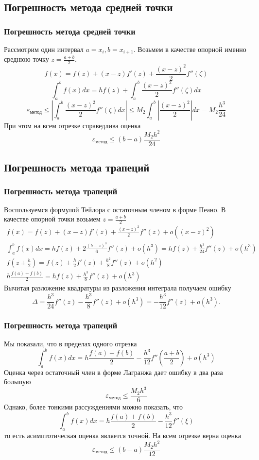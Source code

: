 \documentclass[aspectratio=169,unicode]{beamer}
\begin{document}
\subsection{Погрешность метода средней точки}
\begin{frame}
\frametitle{Погрешность метода средней точки}
	Рассмотрим один интервал $a=x_i, b=x_{i+1}$.
	Возьмем в качестве опорной именно среднюю точку $z = \frac{a+b}{2}$.
	\[
	f(x) = f(z) + (x-z)f'(z) + \frac{(x-z)^2}{2}f''(\zeta)
	\]
	\[
	\int_a^b f(x) dx = h f(z) + \int_a^b \frac{(x-z)^2}{2}f''(\zeta) dx
	\]
	\[
	\varepsilon_{\text{метод}} \leq \left|\int_a^b \frac{(x-z)^2}{2}f''(\zeta) dx \right|
	\leq M_2 \int_a^b \left|\frac{(x-z)^2}{2}\right| dx  = M_2 \frac{h^3}{24}
	\]
	При этом на всем отрезке справедлива оценка
	\[
	\varepsilon_{\text{метод}} \leq (b-a) \frac{M_2h^2}{24}
	\]
\end{frame}

\subsection{Погрешность метода трапеций}
\begin{frame}
\frametitle{Погрешность метода трапеций}
	Воспользуемся формулой Тейлора с остаточным членом в форме Пеано. В качестве опорной точки возьмем $z = \frac{a+b}{2}$
	\begin{gather*}
	f(x) = f(z) + (x-z)f'(z) + \frac{(x-z)^2}{2}f''(z) + o((x-z)^2)\\
	\int_a^b f(x) dx = h f(z) + 2\frac{(b-z)^3}{6}f''(z) + o(h^3) = hf(z) +
\frac{h^3}{24}f''(z) + o(h^3)\\
	f\left(z \pm \frac{h}{2}\right) = f(z) \pm \frac{h}{2} f'(z) + \frac{h^2}{8}
f''(z) + o(h^2)\\
	h\frac{f(a)+f(b)}{2} = hf(z) + \frac{h^3}{8} f''(z) + o(h^3)
	\end{gather*}
	Вычитая разложение квадратуры из разложения интеграла получаем ошибку
	\[
	\Delta = \frac{h^3}{24}f''(z) - \frac{h^3}{8}f''(z) + o(h^3) = -\frac{h^3}{12}f''(z) + o(h^3).
	\]
\end{frame}

\begin{frame}
\frametitle{Погрешность метода трапеций}
	Мы показали, что в пределах одного отрезка
	\[
	\int_a^b f(x) dx = h\frac{f(a)+f(b)}{2} - \frac{h^3}{12}f''\left(\frac{a+b}{2}\right) + o(h^3)
	\]
	Оценка через остаточный член в форме Лагранжа дает ошибку в два раза большую
	\[
	\varepsilon_{\text{метод}} \leq \frac{M_2 h^3}{6}
	\]
	Однако, более тонкими рассуждениями можно показать, что
	\[
	\int_a^b f(x) dx = h\frac{f(a)+f(b)}{2} - \frac{h^3}{12}f''(\xi)
	\]
	то есть асимптотическая оценка является точной.  На всем отрезке верна оценка
	\[
	\varepsilon_{\text{метод}} \leq (b-a) \frac{M_2 h^2}{12}
	\]
\end{frame}
\end{document}
